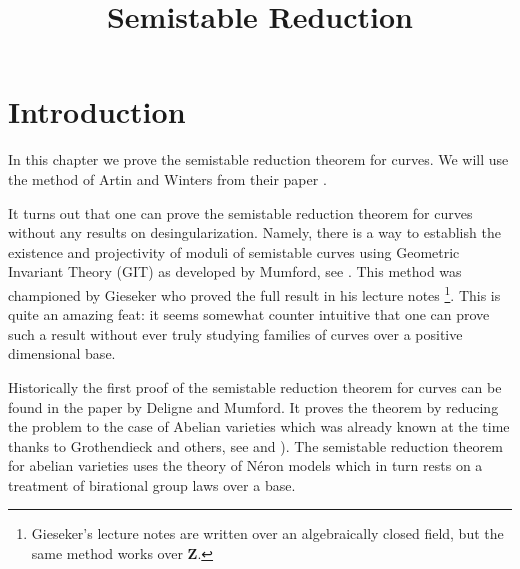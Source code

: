 

%


\title{Semistable Reduction}


\maketitle

\label{section-phantom}

\tableofcontents

\section{Introduction}
\label{section-introduction}

\noindent
In this chapter we prove the semistable reduction theorem for curves.
We will use the method of Artin and Winters from their paper
\cite{Artin-Winters}.

\medskip\noindent
It turns out that one can prove the semistable reduction theorem
for curves without any results on desingularization. Namely, there
is a way to establish the existence and projectivity of moduli
of semistable curves using Geometric Invariant Theory (GIT)
as developed by Mumford, see \cite{GIT}. This method was
championed by Gieseker who proved the full result in his
lecture notes \cite{Gieseker}\footnote{Gieseker's lecture notes
are written over an algebraically closed field, but the same method
works over $\mathbf{Z}$.}. This is quite an amazing
feat: it seems somewhat counter intuitive that one can
prove such a result without ever truly studying families of curves over
a positive dimensional base.

\medskip\noindent
Historically the first proof of the semistable reduction theorem
for curves can be found in the paper \cite{DM} by Deligne and Mumford.
It proves the theorem by reducing the problem to the case of
Abelian varieties which was already known at the time thanks
to Grothendieck and others, see \cite{SGA7-I} and \cite{SGA7-II}).
The semistable reduction theorem for abelian varieties uses the theory
of N\'eron models which in turn rests on a treatment of birational
group laws over a base.

